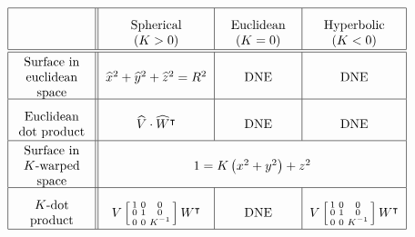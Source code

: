 \documentclass{ximera}
\begin{document}
\[
{\renewcommand{\arraystretch}{2.7}
  \begin{tabular}{|c||c|c|c|}\hline
    & \begin{minipage}{2cm}\begin{center}Spherical ($K>0$)\end{center}\end{minipage} & \begin{minipage}{2cm}\begin{center}Euclidean ($K=0$)\end{center}\end{minipage} & \begin{minipage}{2cm}\begin{center}Hyperbolic ($K<0$)\end{center}\end{minipage}\\\hline\hline
    \begin{minipage}{2cm}\begin{center}Surface in \\ euclidean space\end{center}\end{minipage} & $\hat{x}^{2}+\hat{y}^{2}+\hat{z}^{2}=R^{2}$ & DNE  & DNE \\\hline
    \begin{minipage}{2cm}\begin{center}Euclidean dot product\end{center}\end{minipage} & $\hat{V}\cdot \hat{W}^\transpose$ & DNE  & DNE\\\hline
     \begin{minipage}{2cm}\begin{center}Surface in $K$-warped space\end{center}\end{minipage} & \multicolumn{3}{c|}{$1=K\left(  x^{2}+y^{2}\right)  +z^{2}$}\\\hline
    \begin{minipage}{2cm}\begin{center}$K$-dot product\end{center}\end{minipage} & $V\left[\begin{smallmatrix}1 & 0 & 0\\ 0 & 1 & 0\\ 0 & 0 & K^{-1}\end{smallmatrix}\right] W^\transpose$ &  DNE & $V\left[\begin{smallmatrix}1 & 0 & 0\\ 0 & 1 & 0\\ 0 & 0 & K^{-1}\end{smallmatrix}\right]W^\transpose$\\\hline
\end{tabular}}
\]
\end{document}
